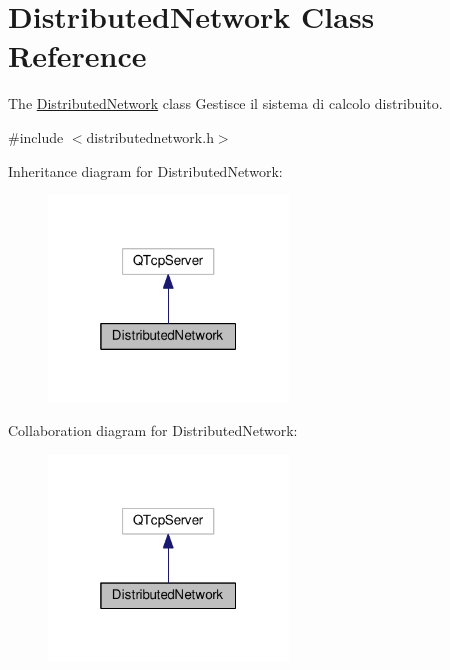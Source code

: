 \hypertarget{classDistributedNetwork}{}\section{Distributed\+Network Class Reference}
\label{classDistributedNetwork}


The \hyperlink{classDistributedNetwork}{Distributed\+Network} class Gestisce il sistema di calcolo distribuito.  




{\ttfamily \#include $<$distributednetwork.\+h$>$}



Inheritance diagram for Distributed\+Network\+:
\nopagebreak
\begin{figure}[H]
\begin{center}
\leavevmode
\includegraphics[width=181pt]{classDistributedNetwork__inherit__graph}
\end{center}
\end{figure}


Collaboration diagram for Distributed\+Network\+:
\nopagebreak
\begin{figure}[H]
\begin{center}
\leavevmode
\includegraphics[width=181pt]{classDistributedNetwork__coll__graph}
\end{center}
\end{figure}
